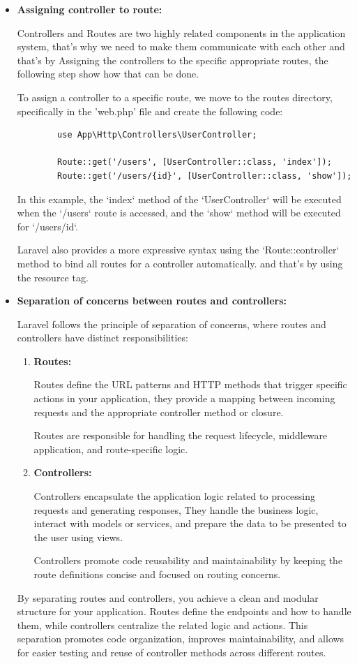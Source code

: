 \begin{itemize}
    \item \textbf{Assigning controller to route:}
    
    \medskip Controllers and Routes are two highly related components in the application system, that's why we need to make them communicate with each other and that's by Assigning the controllers to the specific appropriate routes, the following step show how that can be done.
    
    To assign a controller to a specific route, we move to the routes directory, specifically in the 'web.php' file and create the following code:
    \begin{verbatim}
        use App\Http\Controllers\UserController;
        
        Route::get('/users', [UserController::class, 'index']);
        Route::get('/users/{id}', [UserController::class, 'show']);
    \end{verbatim}
    In this example, the `index` method of the `UserController` will be executed when the `/users` route is accessed, and the `show` method will be executed for `/users/{id}`.

    Laravel also provides a more expressive syntax using the `Route::controller` method to bind all routes for a controller automatically. and that's by using the resource tag.
\item \textbf{Separation of concerns between routes and controllers:}

Laravel follows the principle of separation of concerns, where routes and controllers have distinct responsibilities:

\begin{enumerate}
    \item \textbf{Routes:}
    
    Routes define the URL patterns and HTTP methods that trigger specific actions in your application,
    they provide a mapping between incoming requests and the appropriate controller method or closure.
   
    Routes are responsible for handling the request lifecycle, middleware application, and route-specific logic.
    \item \textbf{Controllers:}
    
     Controllers encapsulate the application logic related to processing requests and generating responses,
     They handle the business logic, interact with models or services, and prepare the data to be presented to the user using views.
    
     Controllers promote code reusability and maintainability by keeping the route definitions concise and focused on routing concerns.
\end{enumerate}
By separating routes and controllers, you achieve a clean and modular structure for your application. Routes define the endpoints and how to handle them, while controllers centralize the related logic and actions. This separation promotes code organization, improves maintainability, and allows for easier testing and reuse of controller methods across different routes.
\end{itemize}

